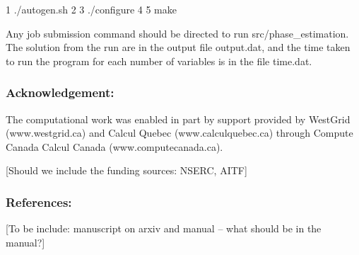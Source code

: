 \begin{DoxyCode}
1 ./autogen.sh
2 
3 ./configure
4 
5 make
\end{DoxyCode}


Any job submission command should be directed to run src/phase\+\_\+estimation. The solution from the run are in the output file output.\+dat, and the time taken to run the program for each number of variables is in the file time.\+dat.

\subsubsection*{Acknowledgement\+:}

The computational work was enabled in part by support provided by West\+Grid (www.\+westgrid.\+ca) and Calcul Quebec (www.\+calculquebec.\+ca) through Compute Canada Calcul Canada (www.\+computecanada.\+ca).

\mbox{[}Should we include the funding sources\+: N\+S\+E\+R\+C, A\+I\+T\+F\mbox{]}

\subsubsection*{References\+:}

\mbox{[}To be include\+: manuscript on arxiv and manual -- what should be in the manual?\mbox{]} 